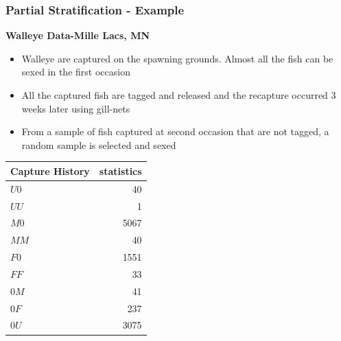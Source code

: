 \documentclass{beamer}
\begin{document}
\begin{frame} \frametitle{Partial Stratification - Example}
\textbf{Walleye Data-Mille Lacs, MN} 
\vspace{3pt}

\begin{itemize}
\item Walleye are captured on the spawning grounds. Almost all the fish can be sexed in the first occasion
\item All the captured fish are tagged and released and the recapture occurred 3 weeks later using gill-nets
\item From a sample of fish captured at second occasion that are not tagged, a random sample is selected and sexed
\end{itemize} 

\begin{center}
\begin{tabular}{ |l|r| } 
\hline
  Capture History & statistics \\ \hline
  $U0$ & 40 \\ \hline
  $UU$ & 1 \\ \hline
  $M0$ & 5067 \\ \hline
  $MM$ & 40 \\ \hline
  $F0$ & 1551 \\ \hline
  $FF$ & 33 \\ \hline
  $0M$ & 41 \\ \hline
  $0F$ & 237 \\ \hline
  $0U$ & 3075 \\ \hline
\end{tabular}
\end{center}




\end{frame}


\end{document}
